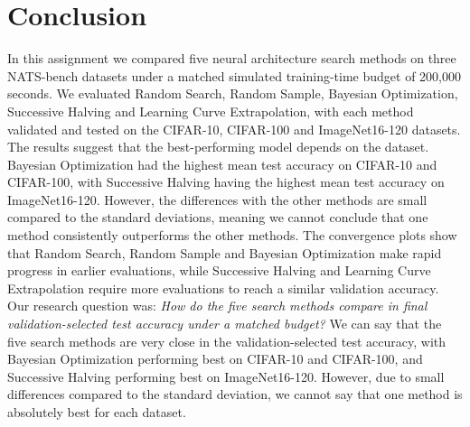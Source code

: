 \documentclass[12pt]{article}
\begin{document}
\section{Conclusion}
In this assignment we compared five neural architecture search methods on three NATS-bench datasets under a matched simulated training-time budget of 200,000 seconds. We evaluated Random Search, Random Sample, Bayesian Optimization, Successive Halving and Learning Curve Extrapolation, with each method validated and tested on the CIFAR-10, CIFAR-100 and ImageNet16-120 datasets. The results suggest that the best-performing model depends on the dataset. Bayesian Optimization had the highest mean test accuracy on CIFAR-10 and CIFAR-100, with Successive Halving having the highest mean test accuracy on ImageNet16-120. However, the differences with the other methods are small compared to the standard deviations, meaning we cannot conclude that one method consistently outperforms the other methods. The convergence plots show that Random Search, Random Sample and Bayesian Optimization make rapid progress in earlier evaluations, while Successive Halving and Learning Curve Extrapolation require more evaluations to reach a similar validation accuracy. Our research question was: \textit{How do the five search methods compare in final validation-selected test accuracy under a matched budget?} We can say that the five search methods are very close in the validation-selected test accuracy, with Bayesian Optimization performing best on CIFAR-10 and CIFAR-100, and Successive Halving performing best on ImageNet16-120. However, due to small differences compared to the standard deviation, we cannot say that one method is absolutely best for each dataset.



\end{document}
